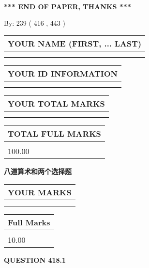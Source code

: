 \documentclass{ctexart}
\begin{document}
   
 \vspace{0.2in}
 
   
   
   
   
\vspace{1.0in} 
{\textbf{\large{ *** END OF PAPER, THANKS *** }}} 
   
   
\hspace{1.0in} By: 
 239 ( 416 ,  443 )
   
   
   
   
\newpage 
\setcounter{page}{ 
   418001 } 
   
   
   
   
\noindent\begin{tabular}{|l|}
\hline
YOUR NAME (FIRST, ... LAST)  \\
\hline
 \\ 
 \\ 
\hline
\end{tabular}
\hspace{0.05in} \begin{tabular}{|l|}
\hline
 YOUR   ID   INFORMATION  \\
\hline
 \\ 
 \\ 
\hline
\end{tabular}
   
   
\vspace{0.2in}\noindent\begin{tabular}{|l|}
\hline
YOUR TOTAL MARKS  \\
\hline
 \\ 
 \\ 
\hline
\end{tabular}
\hspace{0.05in} \begin{tabular}{|l|}
\hline
TOTAL FULL MARKS  \\
\hline
 \\ 
100.00 \\
\hline
\end{tabular}
   
   
 \vspace{0.2in}
{\LARGE {\textbf{ 八道算术和两个选择题}}}
   
   
  
\vspace{0.2in}
  
\noindent\begin{tabular}{|l|}
\hline
 YOUR MARKS  \\
\hline
 \\ 
 \\ 
\hline
\end{tabular}
\hspace{0.05in} \begin{tabular}{|l|}
\hline
 Full Marks  \\
\hline
 \\ 
10.00 \\
\hline
\end{tabular}
{\textbf{\Large{QUESTION
418.1 
}}}
  
\end{document}
